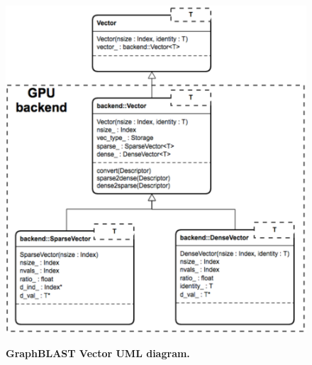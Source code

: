 \begin{figure}[t]
	\includegraphics[width=\linewidth]{fig/graphblast}
	\label{fig:graphblast}
	\caption
	{\textbf{GraphBLAST Vector UML diagram.}}
\end{figure}